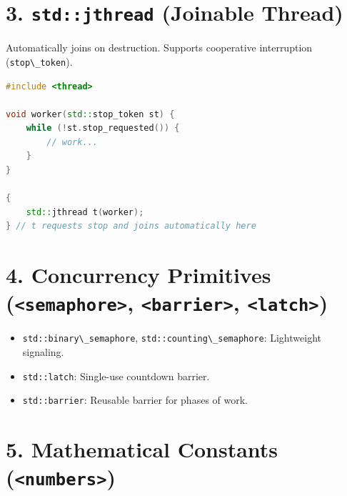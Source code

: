 \hypertarget{stdjthread-joinable-thread}{%
\section{\texorpdfstring{3. \texttt{std::jthread} (Joinable
Thread)}{3. std::jthread (Joinable Thread)}}\label{stdjthread-joinable-thread}}

Automatically joins on destruction. Supports cooperative interruption
(\passthrough{\lstinline!stop\_token!}).

\begin{lstlisting}[language={C++}]
#include <thread>

void worker(std::stop_token st) {
    while (!st.stop_requested()) {
        // work...
    }
}

{
    std::jthread t(worker);
} // t requests stop and joins automatically here
\end{lstlisting}

\hypertarget{concurrency-primitives-semaphore-barrier-latch}{%
\section{\texorpdfstring{4. Concurrency Primitives
(\texttt{\textless{}semaphore\textgreater{}},
\texttt{\textless{}barrier\textgreater{}},
\texttt{\textless{}latch\textgreater{}})}{4. Concurrency Primitives (\textless semaphore\textgreater, \textless barrier\textgreater, \textless latch\textgreater)}}\label{concurrency-primitives-semaphore-barrier-latch}}

\begin{itemize}
\tightlist
\item
  \passthrough{\lstinline!std::binary\_semaphore!},
  \passthrough{\lstinline!std::counting\_semaphore!}: Lightweight
  signaling.
\item
  \passthrough{\lstinline!std::latch!}: Single-use countdown barrier.
\item
  \passthrough{\lstinline!std::barrier!}: Reusable barrier for phases of
  work.
\end{itemize}

\hypertarget{mathematical-constants-numbers}{%
\section{\texorpdfstring{5. Mathematical Constants
(\texttt{\textless{}numbers\textgreater{}})}{5. Mathematical Constants (\textless numbers\textgreater)}}\label{mathematical-constants-numbers}}

